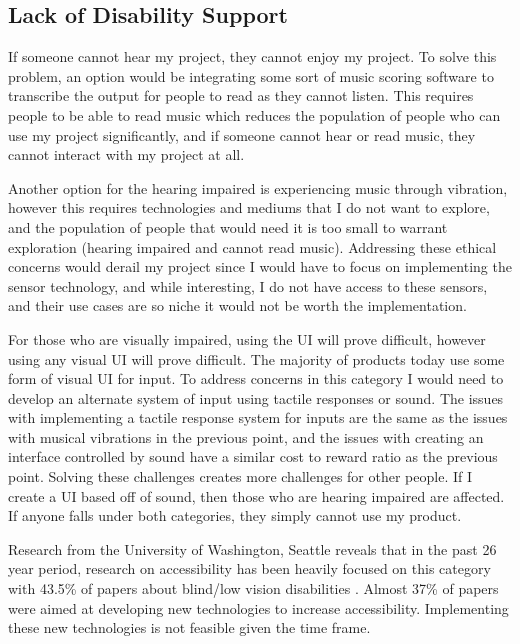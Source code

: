 \documentclass[10pt,twocolumn]{article}
\begin{document}
    \subsection{Lack of Disability Support}
        If someone cannot hear my project, they cannot enjoy my project. To solve this problem, an option would be integrating some sort of music scoring software to transcribe the output for people to read as they cannot listen. This requires people to be able to read music which reduces the population of people who can use my project significantly, and if someone cannot hear or read music, they cannot interact with my project at all. \newline
        
        Another option for the hearing impaired is experiencing music through vibration, however this requires technologies and mediums that I do not want to explore, and the population of people that would need it is too small to warrant exploration (hearing impaired and cannot read music). Addressing these ethical concerns would derail my project since I would have to focus on implementing the sensor technology, and while interesting, I do not have access to these sensors, and their use cases are so niche it would not be worth the implementation.\newline
        
        For those who are visually impaired, using the UI will prove difficult, however using any visual UI will prove difficult. The majority of products today use some form of visual UI for input. To address concerns in this category I would need to develop an alternate system of input using tactile responses or sound. The issues with implementing a tactile response system for inputs are the same as the issues with musical vibrations in the previous point, and the issues with creating an interface controlled by sound have a similar cost to reward ratio as the previous point. Solving these challenges creates more challenges for other people. If I create a UI based off of sound, then those who are hearing impaired are affected. If anyone falls under both categories, they simply cannot use my product. \newline
        
        Research from the University of Washington, Seattle reveals that in the past 26 year period, research on accessibility has been heavily focused on this category with 43.5\% of papers about blind/low vision disabilities \cite{Accessability}. Almost 37\% of papers were aimed at developing new technologies to increase accessibility. Implementing these new technologies is not feasible given the time frame.
    
\end{document}
